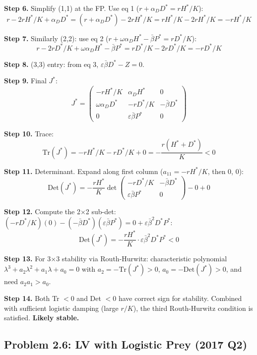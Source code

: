 \documentclass[10pt]{article}
\begin{document}
\begin{solution}
\textbf{Step 6.} Simplify (1,1) at the FP. Use eq 1 ($r + \alpha_D D^* = rH^*/K$):
\[
r - 2rH^*/K + \alpha_D D^* = (r + \alpha_D D^*) - 2rH^*/K = rH^*/K - 2rH^*/K = -rH^*/K
\]

\textbf{Step 7.} Similarly (2,2): use eq 2 ($r + \omega\alpha_D H^* - \bar\beta P^* = rD^*/K$):
\[
r - 2rD^*/K + \omega\alpha_D H^* - \bar\beta P^* = rD^*/K - 2rD^*/K = -rD^*/K
\]

\textbf{Step 8.} (3,3) entry: from eq 3, $\varepsilon\bar\beta D^* - Z = 0$.

\textbf{Step 9.} Final $J^*$:
\[
J^* = \begin{pmatrix} -rH^*/K & \alpha_D H^* & 0 \\ \omega\alpha_D D^* & -rD^*/K & -\bar\beta D^* \\ 0 & \varepsilon\bar\beta P^* & 0 \end{pmatrix}
\]

\textbf{Step 10.} Trace:
\[
\text{Tr}(J^*) = -rH^*/K - rD^*/K + 0 = -\frac{r(H^* + D^*)}{K} < 0
\]

\textbf{Step 11.} Determinant. Expand along first column ($a_{11} = -rH^*/K$, then 0, 0):
\[
\text{Det}(J^*) = -\frac{rH^*}{K}\det\begin{pmatrix} -rD^*/K & -\bar\beta D^* \\ \varepsilon\bar\beta P^* & 0 \end{pmatrix} - 0 + 0
\]

\textbf{Step 12.} Compute the 2$\times$2 sub-det: $(-rD^*/K)(0) - (-\bar\beta D^*)(\varepsilon\bar\beta P^*) = 0 + \varepsilon\bar\beta^2 D^* P^*$:
\[
\text{Det}(J^*) = -\frac{rH^*}{K}\cdot\varepsilon\bar\beta^2 D^* P^* < 0
\]

\textbf{Step 13.} For 3$\times$3 stability via Routh-Hurwitz: characteristic polynomial $\lambda^3 + a_2\lambda^2 + a_1\lambda + a_0 = 0$ with $a_2 = -\text{Tr}(J^*) > 0$, $a_0 = -\text{Det}(J^*) > 0$, and need $a_2 a_1 > a_0$.

\textbf{Step 14.} Both Tr $< 0$ and Det $< 0$ have correct sign for stability. Combined with sufficient logistic damping (large $r/K$), the third Routh-Hurwitz condition is satisfied. \textbf{Likely stable.}
\end{solution}

\subsection{Problem 2.6: LV with Logistic Prey (2017 Q2)}
\end{document}
